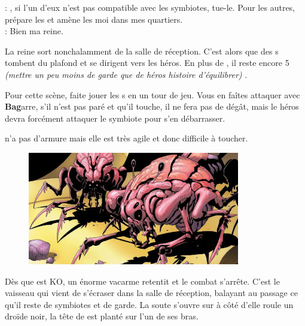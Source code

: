 \begin{quotebox}
\noindent\textbf{}: , si l’un d’eux n’est pas compatible avec les symbiotes, tue-le. Pour les autres, prépare les et amène les moi dans mes quartiers.\\
\noindent\textbf{}: Bien ma reine.
\end{quotebox}
La reine sort nonchalamment de la salle de réception. C’est alors que des s tombent du plafond et se dirigent vers les héros. En plus de , il reste encore 5 \textit{(mettre un peu moins de garde que de héros histoire d’équilibrer)} .

Pour cette scène, faite jouer les s en un tour de jeu. Vous en faîtes attaquer avec \textbf{Bag}arre, s’il n’est pas paré et qu’il touche, il ne fera pas de dégât, mais le héros devra forcément attaquer le symbiote pour s’en débarrasser.

 n’a pas d’armure mais elle est très agile et donc difficile à toucher.

\begin{figure}[h]
\noindent\includegraphics[width=\linewidth]{_img/bestiary/symbiote-abersyn.jpg}
\caption{}
\end{figure}
Dès que  est KO, un énorme vacarme retentit et le combat s’arrête. C’est le vaisseau  qui vient de s’écraser dans la salle de réception, balayant au passage ce qu’il reste de symbiotes et de garde.
La soute s’ouvre sur  à côté d’elle roule un droïde noir, la tête de  est planté sur l’un de ses bras.

